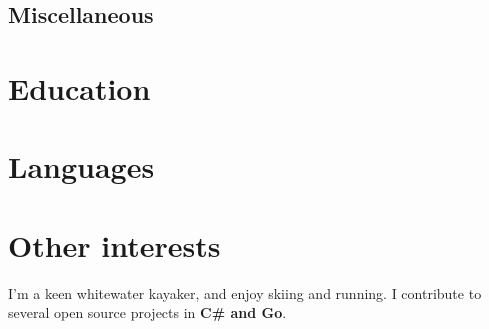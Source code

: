 \documentclass[11pt,a4paper,sans]{moderncv}        %
\begin{document}
\subsection{Miscellaneous}

\section{Education}

\section{Languages}


\section{Other interests}
I'm a keen whitewater kayaker, and enjoy skiing and running. I contribute to several open source projects in \textbf{C\# and Go}.

\clearpage
\end{document}
